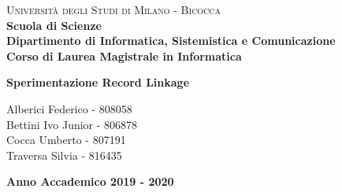 \documentclass[a4paper,12pt]{article}
\renewcommand{\baselinestretch}{1.5}
\begin{document}
\begin{titlepage}
\noindent
    \vspace*{5mm}
	\begin{minipage}[t]{0.15\textwidth}
	    \vspace*{5mm}
	\end{minipage}
	\hspace{1cm}
	\begin{minipage}[t]{0.9\textwidth}
	      \vspace*{5mm}
		{
			{\textsc{Università degli Studi di Milano - Bicocca} } \\
			\textbf{Scuola di Scienze} \\
			\textbf{Dipartimento di Informatica, Sistemistica e Comunicazione} \\
			\textbf{Corso di Laurea Magistrale in Informatica} \\
			\par
		}
	\end{minipage}
	
	\vspace{42mm}

\begin{center}
    {\LARGE{
            \textbf{
            	Sperimentazione Record Linkage \\ }
    }}        
\end{center}

\vspace{40mm}
	
	
	\begin{flushright}
		\large{Alberici Federico - 808058\\} 
		\large{Bettini Ivo Junior - 806878\\} 
		\large{Cocca Umberto - 807191\\} 
		\large{Traversa Silvia - 816435} 
	\end{flushright}
	
	\vspace{15mm}
	\begin{center}
		{\large{\bf Anno Accademico 2019 - 2020}}
	\end{center}


\renewcommand{\baselinestretch}{1.5}

\end{titlepage}
\end{document}
